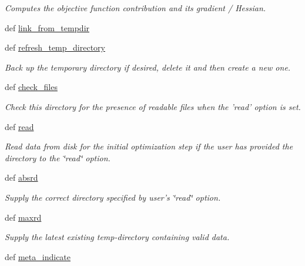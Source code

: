 \begin{DoxyCompactItemize}
\begin{DoxyCompactList}\small\item\em Computes the objective function contribution and its gradient / Hessian. \end{DoxyCompactList}\item 
def \hyperlink{classforcebalance_1_1target_1_1Target_a5aa4958cea0a48138511567a076c5a82}{link\-\_\-from\-\_\-tempdir}
\item 
def \hyperlink{classforcebalance_1_1target_1_1Target_afe815eafab06ac92f10bbf4b88ad95c8}{refresh\-\_\-temp\-\_\-directory}
\begin{DoxyCompactList}\small\item\em Back up the temporary directory if desired, delete it and then create a new one. \end{DoxyCompactList}\item 
def \hyperlink{classforcebalance_1_1target_1_1Target_ac790529c5f85f0547fe3601ad1cf2419}{check\-\_\-files}
\begin{DoxyCompactList}\small\item\em Check this directory for the presence of readable files when the 'read' option is set. \end{DoxyCompactList}\item 
def \hyperlink{classforcebalance_1_1target_1_1Target_afb87b4d33b88bb381c74b76752c5892a}{read}
\begin{DoxyCompactList}\small\item\em Read data from disk for the initial optimization step if the user has provided the directory to the \char`\"{}read\char`\"{} option. \end{DoxyCompactList}\item 
def \hyperlink{classforcebalance_1_1target_1_1Target_abb0a6089d8deaead8f78186cc8e4cbe4}{absrd}
\begin{DoxyCompactList}\small\item\em Supply the correct directory specified by user's \char`\"{}read\char`\"{} option. \end{DoxyCompactList}\item 
def \hyperlink{classforcebalance_1_1target_1_1Target_a961ce7e772836b1465cb44e3f03145df}{maxrd}
\begin{DoxyCompactList}\small\item\em Supply the latest existing temp-\/directory containing valid data. \end{DoxyCompactList}\item 
def \hyperlink{classforcebalance_1_1target_1_1Target_a99c84ef8ea504d7699c927e261f648e4}{meta\-\_\-indicate}

\end{DoxyCompactItemize}
